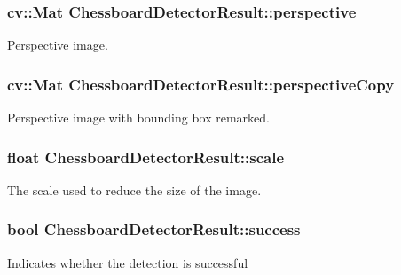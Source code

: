 \subsubsection[{\texorpdfstring{perspective}{perspective}}]{\setlength{\rightskip}{0pt plus 5cm}cv\+::\+Mat Chessboard\+Detector\+Result\+::perspective}\hypertarget{struct_chessboard_detector_result_ae36efe72eb31949739d7ce8905ed2f41}{}\label{struct_chessboard_detector_result_ae36efe72eb31949739d7ce8905ed2f41}
Perspective image. 
\subsubsection[{\texorpdfstring{perspective\+Copy}{perspectiveCopy}}]{\setlength{\rightskip}{0pt plus 5cm}cv\+::\+Mat Chessboard\+Detector\+Result\+::perspective\+Copy}\hypertarget{struct_chessboard_detector_result_a984f12b2b22c6a34a8147aa7d3d3eff0}{}\label{struct_chessboard_detector_result_a984f12b2b22c6a34a8147aa7d3d3eff0}
Perspective image with bounding box remarked. 
\subsubsection[{\texorpdfstring{scale}{scale}}]{\setlength{\rightskip}{0pt plus 5cm}float Chessboard\+Detector\+Result\+::scale}\hypertarget{struct_chessboard_detector_result_abf6c377b55ae8db5b653cb581b0baf30}{}\label{struct_chessboard_detector_result_abf6c377b55ae8db5b653cb581b0baf30}
The scale used to reduce the size of the image. 
\subsubsection[{\texorpdfstring{success}{success}}]{\setlength{\rightskip}{0pt plus 5cm}bool Chessboard\+Detector\+Result\+::success}\hypertarget{struct_chessboard_detector_result_a7f5e6c90f4d7b3c948d1e1ddab933df9}{}\label{struct_chessboard_detector_result_a7f5e6c90f4d7b3c948d1e1ddab933df9}
Indicates whether the detection is successful 
